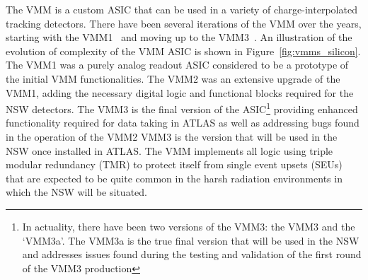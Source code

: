 The VMM is a custom ASIC that can be used in a variety of charge-interpolated tracking
detectors.
There have been several iterations of the VMM over the years, starting with the VMM1~\cite{VMM1GDG} and
moving up to the VMM3~\cite{VMMASIC,VMM3George}.
An illustration of the evolution of complexity of the VMM ASIC is shown in Figure~\ref{fig:vmms_silicon}.
The VMM1 was a purely analog readout ASIC considered to be a prototype of the initial VMM functionalities.
The VMM2 was an extensive upgrade of the VMM1, adding the necessary digital logic and functional blocks
required for the NSW detectors.
The VMM3 is the final version of the ASIC\footnote{In actuality, there have been two versions of the
VMM3: the VMM3 and the `VMM3a'. The VMM3a is the true final version that will be used in the NSW
and addresses issues found during the testing and validation of the first round of the VMM3 production}
providing enhanced functionality required for data taking in ATLAS
as well as addressing bugs found in the operation of the VMM2
VMM3 is the version that will be used
in the NSW once installed in ATLAS.
The VMM implements all logic using triple modular redundancy (TMR) to protect itself
from single event upsets (SEUs) that are expected to be quite common in the
harsh radiation environments in which the NSW will be situated.

